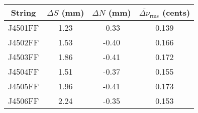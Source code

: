 \begin{tabular}{cccc}
\toprule
String & $\Delta S$ (mm) & $\Delta N$ (mm) & $\overline{\Delta \nu}_\text{rms}$ (cents) \\
\midrule
J4501FF & 1.23 & -0.33 & 0.139 \\
J4502FF & 1.53 & -0.40 & 0.166 \\
J4503FF & 1.86 & -0.41 & 0.172 \\
J4504FF & 1.51 & -0.37 & 0.155 \\
J4505FF & 1.96 & -0.41 & 0.173 \\
J4506FF & 2.24 & -0.35 & 0.153 \\
\bottomrule
\end{tabular}

